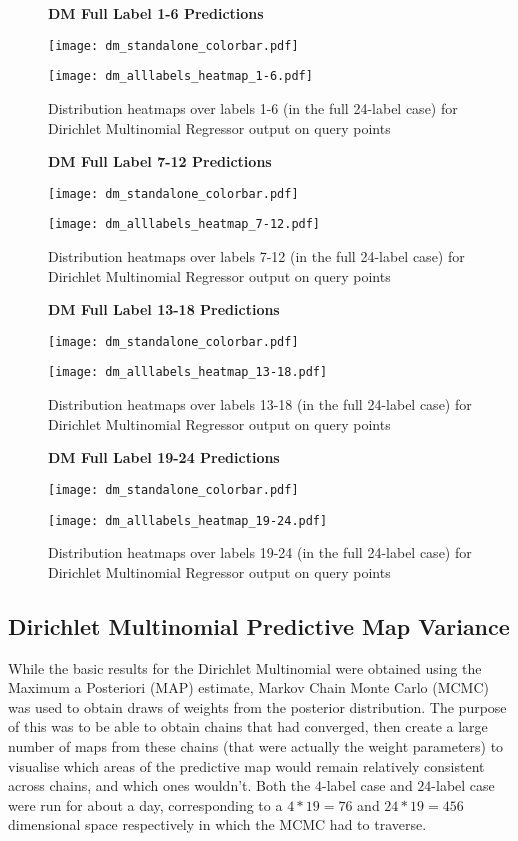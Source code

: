 \begin{figure}[H]
    \textbf{DM Full Label 1-6 Predictions}
    \centerline{\texttt{[image: dm\_standalone\_colorbar.pdf]}}
    \centerline{\texttt{[image: dm\_alllabels\_heatmap\_1-6.pdf]}}
    \caption{Distribution heatmaps over labels 1-6 (in the full 24-label case) for Dirichlet Multinomial Regressor output on query points}
    \label{fig:dm_24-1_label_heatmap}
    \hfill
\end{figure}
\begin{figure}[H]
    \textbf{DM Full Label 7-12 Predictions}
    \centerline{\texttt{[image: dm\_standalone\_colorbar.pdf]}}
    \centerline{\texttt{[image: dm\_alllabels\_heatmap\_7-12.pdf]}}
    \caption{Distribution heatmaps over labels 7-12 (in the full 24-label case) for Dirichlet Multinomial Regressor output on query points}
    \label{fig:dm_24-2_label_heatmap}
    \hfill
\end{figure}
\begin{figure}[H]
    \textbf{DM Full Label 13-18 Predictions}
    \centerline{\texttt{[image: dm\_standalone\_colorbar.pdf]}}
    \centerline{\texttt{[image: dm\_alllabels\_heatmap\_13-18.pdf]}}
    \caption{Distribution heatmaps over labels 13-18 (in the full 24-label case) for Dirichlet Multinomial Regressor output on query points}
    \label{fig:dm_24-3_label_heatmap}
    \hfill
\end{figure}
\begin{figure}[H]
    \textbf{DM Full Label 19-24 Predictions}
    \centerline{\texttt{[image: dm\_standalone\_colorbar.pdf]}}
    \centerline{\texttt{[image: dm\_alllabels\_heatmap\_19-24.pdf]}}
    \caption{Distribution heatmaps over labels 19-24 (in the full 24-label case) for Dirichlet Multinomial Regressor output on query points}
    \label{fig:dm_24-4_label_heatmap}
    \hfill
\end{figure}

\subsection{Dirichlet Multinomial Predictive Map Variance}

While the basic results for the Dirichlet Multinomial were obtained using the Maximum a Posteriori (MAP) estimate, Markov Chain Monte Carlo (MCMC) was used to obtain draws of weights from the posterior distribution. The purpose of this was to be able to obtain chains that had converged, then create a large number of maps from these chains (that were actually the weight parameters) to visualise which areas of the predictive map would remain relatively consistent across chains, and which ones wouldn't. Both the $4$-label case and $24$-label case were run for about a day, corresponding to a $4*19=76$ and $24*19=456$ dimensional space respectively in which the MCMC had to traverse.

